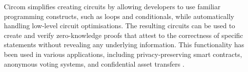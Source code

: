 Circom simplifies creating circuits by allowing developers to use familiar programming constructs, such as loops and conditionals, while automatically handling low-level circuit optimisations. The resulting circuits can be used to create and verify zero-knowledge proofs that attest to the correctness of specific statements without revealing any underlying information. This functionality has been used in various applications, including privacy-preserving smart contracts, anonymous voting systems, and confidential asset transfers \cite{maller2019sonic2}.

